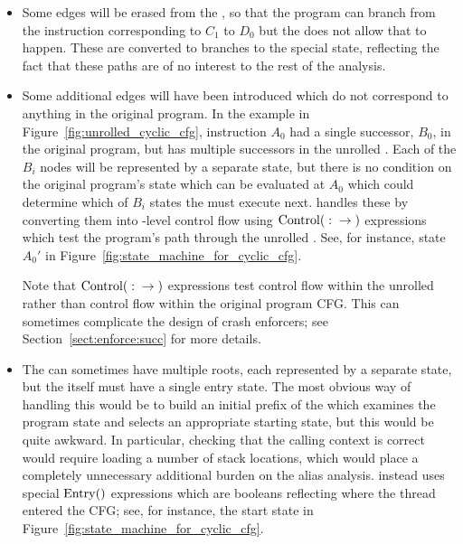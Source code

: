 \begin{itemize}
\item
  Some edges will be erased from the , so that the
  program can branch from the instruction corresponding to $C_1$ to
  $D_0$ but the  does not allow that to happen.  These
  are converted to branches to the special {\stUnreached} state,
  reflecting the fact that these paths are of no interest to the rest
  of the analysis.

\item
  Some additional edges will have been introduced which do not
  correspond to anything in the original program.  In the example in
  Figure~\ref{fig:unrolled_cyclic_cfg}, instruction $A_0$ had a single
  successor, $B_0$, in the original program, but has multiple
  successors in the unrolled .  Each of the $B_i$
   nodes will be represented by a separate
          {\StateMachine} state, but there is no condition on the
          original program's state which can be evaluated at $A_0$
          which could determine which of $B_i$ states the
          {\StateMachine} must execute next.  {\Technique} handles
          these by converting them into \StateMachine-level control
          flow using $\mathrm{Control}(\mathrm{}:\mathrm{} \rightarrow \mathrm{})$ expressions which test the
          program's path through the unrolled .  See, for
          instance, state $A_0'$ in
          Figure~\ref{fig:state_machine_for_cyclic_cfg}.

  Note that $\mathrm{Control}(\mathrm{}:\mathrm{} \rightarrow \mathrm{})$ expressions test control flow within
  the unrolled  rather than control flow within the
  original program CFG.  This can sometimes complicate the design of
  crash enforcers; see Section~\ref{sect:enforce:succ} for more
  details.

\item
  The  can sometimes have multiple roots, each
  represented by a separate {\StateMachine} state, but the
  {\StateMachine} itself must have a single entry state.  The most
  obvious way of handling this would be to build an initial prefix of
  the {\StateMachine} which examines the program state and selects an
  appropriate starting state, but this would be quite awkward.  In
  particular, checking that the calling context is correct would
  require loading a number of stack locations, which would place a
  completely unnecessary additional burden on the alias analysis.
  {\Technique} instead uses special $\mathrm{Entry}()$ expressions which
  are booleans reflecting where the thread entered the CFG; see, for
  instance, the start state in
  Figure~\ref{fig:state_machine_for_cyclic_cfg}.

\end{itemize}

